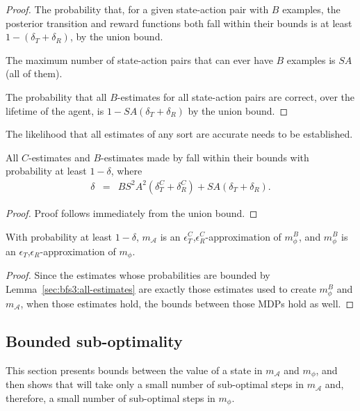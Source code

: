 \begin{proof}
The probability that, for a given state-action pair with $B$ examples, the posterior transition and reward functions both fall within their bounds is at least $1-(\delta_T+\delta_R)$, by the union bound.

The maximum number of state-action pairs that can ever have $B$ examples is $SA$ (all of them).

The probability that all $B$-estimates for all state-action pairs are correct, over the lifetime of the agent, is $1-SA(\delta_T+\delta_R)$ by the union bound.
\end{proof}

The likelihood that all estimates of any sort are accurate needs to be established.

\begin{lemma}
\label{sec:bfs3:all-estimates}
All $C$-estimates and $B$-estimates made by  fall within their bounds with probability at least $1-\delta$, where
\begin{eqnarray}
\delta &=& BS^2A^2(\delta_T^C+\delta_R^C)+ SA(\delta_T+\delta_R).
\end{eqnarray}
\end{lemma}

\begin{proof}
Proof follows immediately from the union bound.
\end{proof}

\begin{lemma}
With probability at least $1-\delta$, $m_\mathcal{A}$ is an $\epsilon_T^C$,$\epsilon_R^C$-approximation of $m_\phi^B$, and $m_\phi^B$ is an $\epsilon_T$,$\epsilon_R$-approximation of $m_\phi$.
\end{lemma}

\begin{proof}
Since the estimates whose probabilities are bounded by Lemma~\ref{sec:bfs3:all-estimates} are exactly those estimates used to create $m_\phi^B$ and $m_\mathcal{A}$, when those estimates hold, the bounds between those MDPs hold as well.
\end{proof}

\subsection{Bounded sub-optimality}

This section presents bounds between the value of a state in $m_\mathcal{A}$ and $m_\phi$, and then shows that  will take only a small number of sub-optimal steps in $m_\mathcal{A}$ and, therefore, a small number of sub-optimal steps in $m_\phi$.


